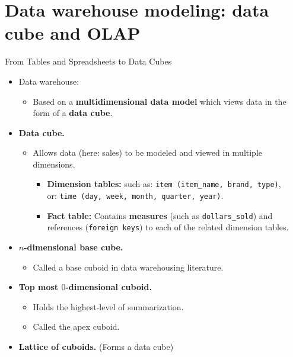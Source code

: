 \section{Data warehouse modeling: data cube and OLAP}

\begin{frame}{From Tables and Spreadsheets to Data Cubes}
  \begin{itemize}
  \item Data warehouse:
    \begin{itemize}
    \item Based on a \textbf{\color{airforceblue}multidimensional data model} which views data in the form of a \textbf{data cube}.
    \end{itemize}
  \item \textbf{Data cube.}
    \begin{itemize}
    \item Allows data (here: sales) to be modeled and viewed in multiple dimensions.
      \begin{itemize}
      \item \textbf{Dimension tables:} such as: \texttt{item (item\_name, brand, type)},\\
        or: \texttt{time (day, week, month, quarter, year)}.
      \item \textbf{Fact table:} Contains \textbf{measures} (such as \texttt{dollars\_sold}) and references (\texttt{foreign keys}) to each of the related dimension tables.
      \end{itemize}
    \end{itemize}
  \item \textbf{$n$-dimensional base cube.}
    \begin{itemize}
    \item Called a base cuboid in data warehousing literature.
    \end{itemize}
  \item \textbf{Top most $0$-dimensional cuboid.}
    \begin{itemize}
    \item Holds the highest-level of summarization.
    \item Called the apex cuboid.
    \end{itemize}
  \item \textbf{Lattice of cuboids.} (Forms a data cube)
  \end{itemize}
\end{frame}

